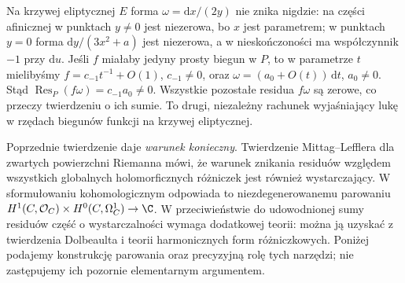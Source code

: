 \begin{przyklad}
Na krzywej eliptycznej $E$ forma $\omega=\mathrm dx/(2y)$
nie znika nigdzie: na części afinicznej w punktach
$y\ne0$ jest niezerowa, bo $x$ jest parametrem;
w punktach $y=0$ forma $\mathrm dy/(3x^2+a)$ jest
niezerowa, a w nieskończoności ma współczynnik $-1$
przy $\mathrm du$. Jeśli $f$ miałaby jedyny prosty
biegun w $P$, to w parametrze $t$ mielibyśmy
$f=c_{-1}t^{-1}+O(1)$, $c_{-1}\ne0$, oraz
$\omega=(a_0+O(t))\,\mathrm dt$, $a_0\ne0$.
Stąd $\operatorname{Res}_P(f\omega)=c_{-1}a_0\ne0$.
Wszystkie pozostałe residua $f\omega$ są zerowe,
co przeczy twierdzeniu o ich sumie.
To drugi, niezależny rachunek wyjaśniający lukę
w rzędach biegunów funkcji na krzywej eliptycznej.
\end{przyklad}

\begin{uwaga}
Poprzednie twierdzenie daje \emph{warunek konieczny}.
Twierdzenie Mittag--Lefflera dla zwartych powierzchni
Riemanna mówi, że warunek znikania residuów względem
wszystkich globalnych holomorficznych różniczek
jest również wystarczający. W sformułowaniu
kohomologicznym odpowiada to niezdegenerowanemu
parowaniu
$H^1(C,\mathcal O_C)\times H^0(C,\Omega^1_C)\to\C$.
W przeciwieństwie do udowodnionej sumy residuów
część o wystarczalności wymaga dodatkowej teorii:
można ją uzyskać z twierdzenia Dolbeaulta i teorii
harmonicznych form różniczkowych. Poniżej podajemy
konstrukcję parowania oraz precyzyjną rolę tych
narzędzi; nie zastępujemy ich pozornie elementarnym
argumentem.
\end{uwaga}

